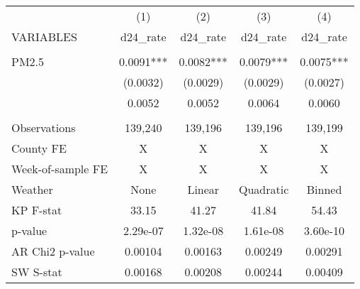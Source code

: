 \begin{tabular}{lcccc} \hline
 & (1) & (2) & (3) & (4) \\
VARIABLES & d24\_rate & d24\_rate & d24\_rate & d24\_rate \\ \hline
 &  &  &  &  \\
PM2.5 & 0.0091*** & 0.0082*** & 0.0079*** & 0.0075*** \\
 & (0.0032) & (0.0029) & (0.0029) & (0.0027) \\
 & 0.0052 & 0.0052 & 0.0064 & 0.0060 \\
 &  &  &  &  \\
Observations & 139,240 & 139,196 & 139,196 & 139,199 \\
County FE & X & X & X & X \\
Week-of-sample FE & X & X & X & X \\
Weather & None & Linear & Quadratic & Binned \\
KP F-stat & 33.15 & 41.27 & 41.84 & 54.43 \\
p-value & 2.29e-07 & 1.32e-08 & 1.61e-08 & 3.60e-10 \\
AR Chi2 p-value & 0.00104 & 0.00163 & 0.00249 & 0.00291 \\
 SW S-stat & 0.00168 & 0.00208 & 0.00244 & 0.00409 \\ \hline
\end{tabular}

